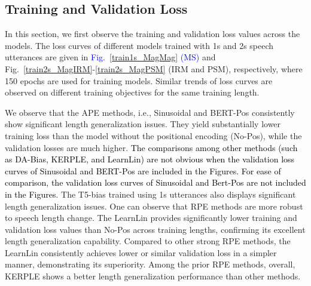 \documentclass[journal]{IEEEtran}
\begin{document}
\subsection{Training and Validation Loss}\label{sec:5.1}
In this section, we first observe the training and validation loss values across the models. The loss curves of different models trained with 1s and 2s speech utterances are given in \textcolor{blue}{Fig.~\ref{train1s_MagMag} (MS)} and Fig.~\ref{train2s_MagIRM}-\ref{train2s_MagPSM} (IRM and PSM), respectively, where 150 epochs are used for training models. Similar trends of loss curves are observed on different training objectives for the same training length. 




% 



We observe that the APE methods, i.e., Sinusoidal and BERT-Pos consistently show significant length generalization issues. They yield substantially lower training loss than the model without the positional encoding (No-Pos), while the validation losses are much higher. \textcolor{black}{The comparisons among other methods (such as DA-Bias, KERPLE, and LearnLin) are not obvious when the validation loss curves of Sinusoidal and BERT-Pos are included in the Figures. For ease of comparison, the validation loss curves of Sinusoidal and Bert-Pos are not included in the Figures.} The T5-bias trained using 1s utterances also displays significant length generalization issues. One can observe that RPE methods are more robust to speech length change. The LearnLin provides significantly lower training and validation loss values than No-Pos across training lengths, confirming its excellent length generalization capability. Compared to other strong RPE methods, the LearnLin consistently achieves lower or similar validation loss in a simpler manner, demonstrating its superiority. Among the prior RPE methods, overall, KERPLE shows a better length generalization performance than other methods. 

\end{document}

